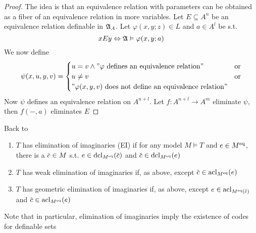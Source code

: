 \documentclass[11pt]{article}
\begin{document}
\begin{proof}
The idea is that an equivalence relation with parameters can be obtained as a fiber of an
equivalence relation in more variables. Let \(E\subseteq A^n\) be an equivalence relation definable
in \(\mathfrak{A}_A\). Let \(\varphi(x,y;z)\in L\) and \(a\in A^l\) be s.t.
\begin{equation*}
xEy\Leftrightarrow\mathfrak{A}\vDash\varphi(x,y;a)
\end{equation*}
We now define
\begin{equation*}
\psi(x,u,y,v)=
\begin{cases}
u=v\wedge"\varphi\text{ defines an equivalence relation}"&\text{or}\\
u\neq v&\text{or}\\
"\varphi(x,y,v)\text{ does not define an equivalence relation}"
\end{cases}
\end{equation*}
Now \(\psi\) defines an equivalence relation on \(A^{n+l}\). Let \(f:A^{n+l}\to A^m\) eliminate \(\psi\),
then \(f(-,a)\) eliminates \(E\)
\end{proof}

Back to \cite{PillayNoteStability}

\begin{definition}[]
\begin{enumerate}
\item \(T\) has elimination of imaginaries (EI) if for any model \(M\vDash T\) and \(e\in M^{\operatorname{eq}}\), there
is a \(\barc\in M\) s.t. \(e\in\dcl_{M^{\eq}}(\barc)\) and \(\barc\in\dcl_{M^{\eq}}(e)\)
\item \(T\) has weak elimination of imaginaries if, as above, except \(\barc\in\acl_{M^{\eq}}(e)\)
\item \(T\) has geometric elimination of imaginaries if, as above,
except \(e\in\acl_{M^{\eq}(\barc)}\) and \(\barc\in\acl_{M^{\eq}}(e)\)
\end{enumerate}
\end{definition}

Note that in particular, elimination of imaginaries imply the existence of codes for definable sets
\end{document}
